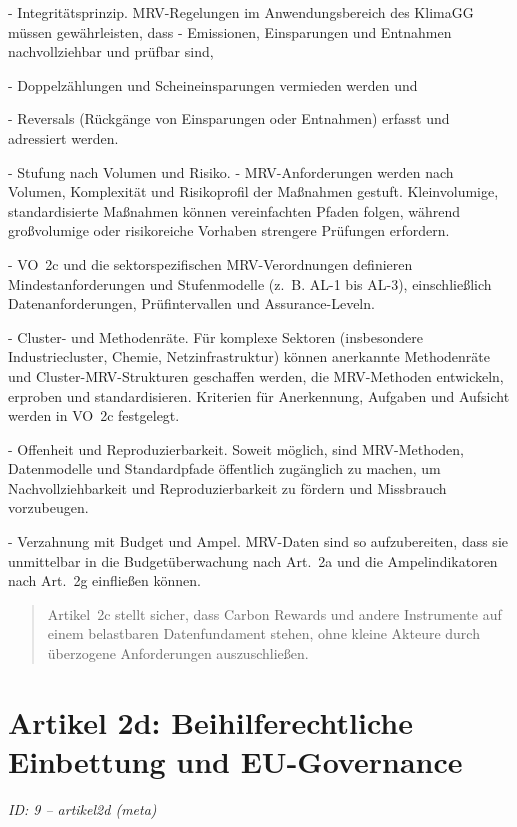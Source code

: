 \documentclass[12pt,a4paper]{scrartcl}
\begin{document}
- Integritätsprinzip. MRV-Regelungen im Anwendungsbereich des KlimaGG müssen gewährleisten, dass
- Emissionen, Einsparungen und Entnahmen nachvollziehbar und prüfbar sind,

- Doppelzählungen und Scheineinsparungen vermieden werden und

- Reversals (Rückgänge von Einsparungen oder Entnahmen) erfasst und adressiert werden.

- Stufung nach Volumen und Risiko.
- MRV-Anforderungen werden nach Volumen, Komplexität und Risikoprofil der Maßnahmen gestuft. Kleinvolumige, standardisierte Maßnahmen können vereinfachten Pfaden folgen, während großvolumige oder risikoreiche Vorhaben strengere Prüfungen erfordern.

- VO 2c und die sektorspezifischen MRV-Verordnungen definieren Mindestanforderungen und Stufenmodelle (z. B. AL-1 bis AL-3), einschließlich Datenanforderungen, Prüfintervallen und Assurance-Leveln.

- Cluster- und Methodenräte. Für komplexe Sektoren (insbesondere Industriecluster, Chemie, Netzinfrastruktur) können anerkannte Methodenräte und Cluster-MRV-Strukturen geschaffen werden, die MRV-Methoden entwickeln, erproben und standardisieren. Kriterien für Anerkennung, Aufgaben und Aufsicht werden in VO 2c festgelegt.

- Offenheit und Reproduzierbarkeit. Soweit möglich, sind MRV-Methoden, Datenmodelle und Standardpfade öffentlich zugänglich zu machen, um Nachvollziehbarkeit und Reproduzierbarkeit zu fördern und Missbrauch vorzubeugen.

- Verzahnung mit Budget und Ampel. MRV-Daten sind so aufzubereiten, dass sie unmittelbar in die Budgetüberwachung nach Art. 2a und die Ampelindikatoren nach Art. 2g einfließen können.

{\footnotesize\begin{quote}
Artikel 2c stellt sicher, dass Carbon Rewards und andere Instrumente auf einem belastbaren Datenfundament stehen, ohne kleine Akteure durch überzogene Anforderungen auszuschließen.
\end{quote}}



\section[Artikel 2d: Beihilferechtliche Einbettung und EU-Governance]{Artikel 2d: Beihilferechtliche Einbettung und EU-Governance}
\noindent\textit{ID: 9 -- artikel2d (meta)}
\end{document}
